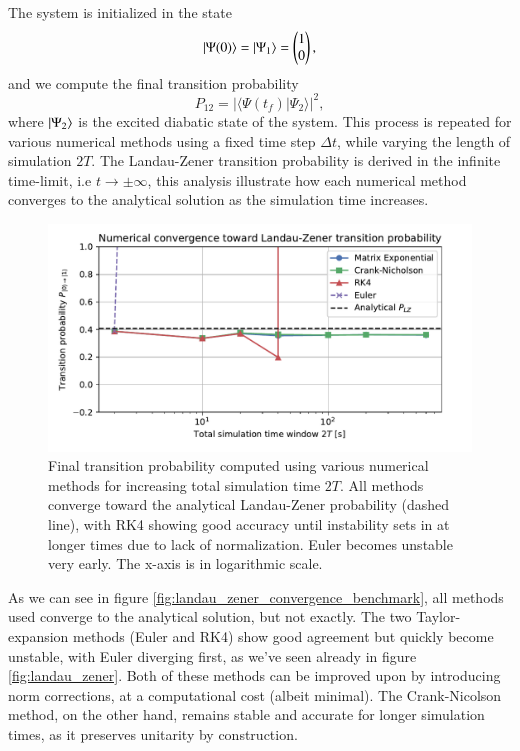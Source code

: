 \documentclass{subfiles}
\begin{document}
The system is initialized in the state $$\ket{\Psi(0)} = \ket{\Psi_1} = \begin{pmatrix} 1 \\ 0 \end{pmatrix},$$ and we compute the final transition probability $$P_{12} = |\langle \Psi(t_f) | \Psi_2 \rangle|^2,$$ where $\ket{\Psi_2}$ is the excited diabatic state of the system. This process is repeated for various numerical methods using a fixed time step $\Delta t$, while varying the length of simulation $2T$. The Landau-Zener transition probability is derived in the infinite time-limit, i.e $t\rightarrow \pm \infty$, this analysis illustrate how each numerical method converges to the analytical solution as the simulation time increases.
\begin{figure}[h!]
\centering
\includegraphics[width=1.0\textwidth]{figs/landau_zener_convergence_benchmark.pdf}
\caption{Final transition probability computed using various numerical methods for increasing total simulation time $
2T$. All methods converge toward the analytical Landau-Zener probability (dashed line), with RK4 showing good accuracy until instability sets in at longer times due to lack of normalization. Euler becomes unstable very early. The x-axis is in logarithmic scale.}
\end{figure}

As we can see in figure \eqref{fig:landau_zener_convergence_benchmark}, all methods used converge to the analytical solution, but not exactly. The two Taylor-expansion methods (Euler and RK4) show good agreement but quickly become unstable, with Euler diverging first, as we've seen already in figure \eqref{fig:landau_zener}. Both of these methods can be improved upon by introducing norm corrections, at a computational cost (albeit minimal). The Crank-Nicolson method, on the other hand, remains stable and accurate for longer simulation times, as it preserves unitarity by construction. 
\\ \\ 
\end{document}
